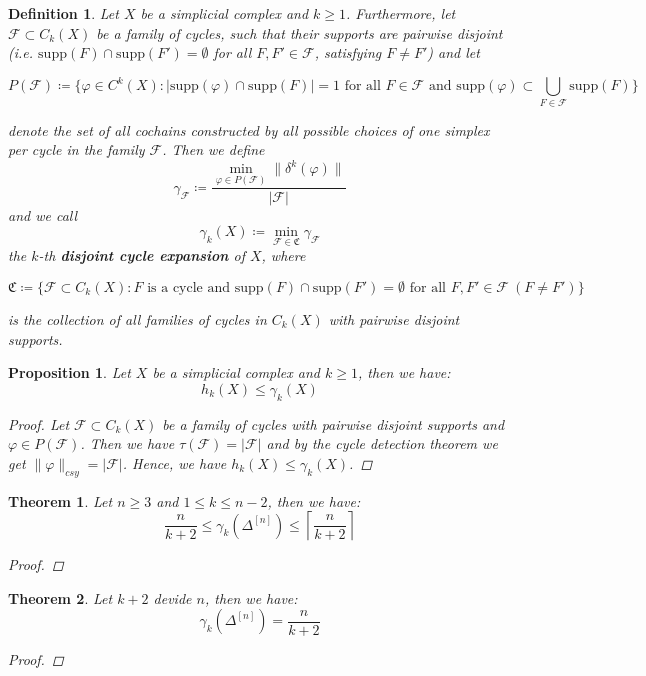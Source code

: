 \documentclass{article}
\newcommand{\supp}{\mathrm{supp}}
\newtheorem{defi}{Definition}[section]
\newtheorem{prop}{Proposition}[section]
\newtheorem{thm}{Theorem}[section]
\begin{document}
\begin{defi}
Let $X$ be a simplicial complex and $k\geq 1$. Furthermore, let $\mathcal{F}\subset C_k(X)$ be a family of cycles, such that their supports are pairwise disjoint (i.e. $\supp(F)\cap\supp(F')=\emptyset$ for all $F,F'\in\mathcal{F}$, satisfying $F\neq F'$) and let
\begin{small}
\[
P(\mathcal{F})\coloneqq\{\varphi\in C^k(X):|\supp(\varphi)\cap\supp(F)|=1\text{ for all }F\in\mathcal{F}\text{ and }\supp(\varphi)\subset\bigcup\limits_{F\in\mathcal{F}}\supp(F)\}
\]
\end{small}
denote the set of all cochains constructed by all possible choices of one simplex per cycle in the family $\mathcal{F}$. Then we define
\[
\gamma_{\mathcal{F}}\coloneqq\frac{\min\limits_{\varphi\in P(\mathcal{F})}\|\delta^k(\varphi)\|}{|\mathcal{F}|}
\]
and we call
\[
\gamma_k(X)\coloneqq\min\limits_{\mathcal{F}\in\mathfrak{C}}\gamma_{\mathcal{F}}
\]
the $k$-th \textbf{disjoint cycle expansion} of $X$, where
\begin{small}
\[
\mathfrak{C}\coloneqq\{\mathcal{F}\subset C_k(X):F\text{ is a cycle and }\supp(F)\cap\supp(F')=\emptyset\text{ for all }F,F'\in\mathcal{F}\:(F\neq F')\}
\]
\end{small}
is the collection of all families of cycles in $C_k(X)$ with pairwise disjoint supports.
\end{defi}

\begin{prop}\label{proposition2}
Let $X$ be a simplicial complex and $k\geq 1$, then we have:
\[
h_k(X)\leq\gamma_k(X)
\]
\begin{proof}
Let $\mathcal{F}\subset C_k(X)$ be a family of cycles with pairwise disjoint supports and $\varphi\in P(\mathcal{F})$. Then we have $\tau(\mathcal{F})=|\mathcal{F}|$ and by the cycle detection theorem we get $\|\varphi\|_{csy}=|\mathcal{F}|$. Hence, we have $h_k(X)\leq\gamma_k(X)$.
\end{proof}
\end{prop}

\begin{thm}\label{theorem1}
Let $n\geq 3$ and $1\leq k\leq n-2$, then we have:
\[
\frac{n}{k+2}\leq\gamma_k(\Delta^{[n]})\leq\left\lceil\frac{n}{k+2}\right\rceil
\]
\begin{proof}

\end{proof}
\end{thm}

\begin{thm}\label{theorem2}
Let $k+2$ devide $n$, then we have:
\[
\gamma_k(\Delta^{[n]})=\frac{n}{k+2}
\]
\begin{proof}

\end{proof}
\end{thm}
\end{document}
